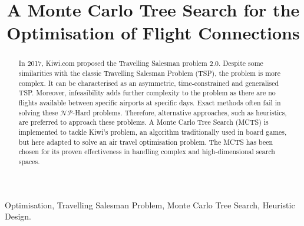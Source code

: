 \documentclass[conference]{IEEEtran}
\begin{document}
\title{A Monte Carlo Tree Search for the
Optimisation of Flight Connections
}

\author{
}


\maketitle

\begin{abstract}
In 2017, Kiwi.com proposed the Travelling Salesman problem 2.0. Despite some similarities with the classic Travelling Salesman Problem (TSP), the problem is more complex. It can be characterised as an asymmetric, time-constrained and generalised TSP. Moreover, infeasibility adds further complexity to the problem as there are no flights available between specific airports at specific days. Exact methods often fail in solving these $\mathcal{NP}$-Hard problems. Therefore, alternative approaches, such as heuristics, are preferred to approach these problems. A Monte Carlo Tree Search (MCTS) is implemented to tackle Kiwi's problem, an algorithm traditionally used in board games, but here adapted to solve an air travel optimisation problem. The MCTS has been chosen for its proven effectiveness in handling complex and high-dimensional search spaces.

\end{abstract}

\begin{IEEEkeywords}
Optimisation, Travelling Salesman Problem, Monte Carlo Tree Search, Heuristic Design.
\end{IEEEkeywords}









\end{document}
